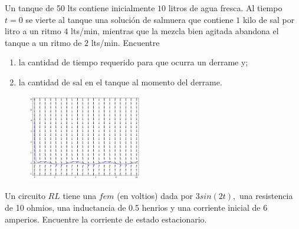 \begin{problema}
	Un tanque de 50 lts contiene inicialmente $10$ litros de agua fresca. Al tiempo $t=0$ se vierte al tanque una solución de salmuera que contiene $1$ kilo de sal por litro a un ritmo $4$ lts/min, mientras que la mezcla bien agitada abandona el tanque a un ritmo de $2$ lts/min. Encuentre
	\begin{enumerate}
		\item la cantidad de tiempo requerido para que ocurra un derrame y;
		\item la cantidad de sal en el tanque al momento del derrame.
	\end{enumerate}

\end{problema}

\begin{figure}
	\centering
	\includegraphics[width=5cm,keepaspectratio=true]{./edo/img020505.png}
	\label{fig:020505}
\end{figure}

\begin{problema}
	Un circuito $RL$ tiene una $fem$ (en voltios) dada por $3sin(2t),$ una resistencia de 10 ohmios, una inductancia de 0.5 henrios y una corriente inicial de 6 amperios. Encuentre la corriente de estado estacionario.
\end{problema}



